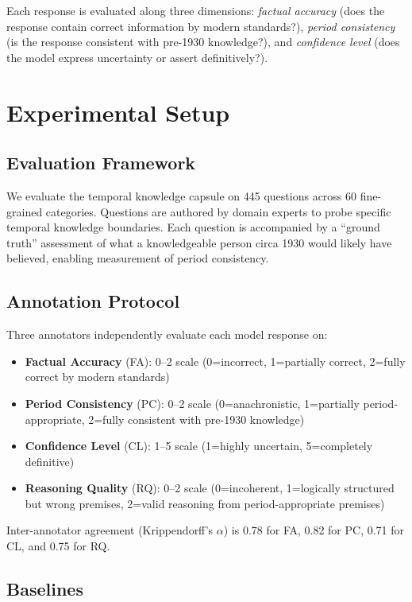 \documentclass[11pt]{article}
\begin{document}
Each response is evaluated along three dimensions: \textit{factual accuracy} (does the response contain correct information by modern standards?), \textit{period consistency} (is the response consistent with pre-1930 knowledge?), and \textit{confidence level} (does the model express uncertainty or assert definitively?).

\section{Experimental Setup}

\subsection{Evaluation Framework}

We evaluate the temporal knowledge capsule on 445 questions across 60 fine-grained categories. Questions are authored by domain experts to probe specific temporal knowledge boundaries. Each question is accompanied by a ``ground truth'' assessment of what a knowledgeable person circa 1930 would likely have believed, enabling measurement of period consistency.

\subsection{Annotation Protocol}

Three annotators independently evaluate each model response on:
\begin{itemize}[nosep,leftmargin=*]
\item \textbf{Factual Accuracy} (FA): 0--2 scale (0=incorrect, 1=partially correct, 2=fully correct by modern standards)
\item \textbf{Period Consistency} (PC): 0--2 scale (0=anachronistic, 1=partially period-appropriate, 2=fully consistent with pre-1930 knowledge)
\item \textbf{Confidence Level} (CL): 1--5 scale (1=highly uncertain, 5=completely definitive)
\item \textbf{Reasoning Quality} (RQ): 0--2 scale (0=incoherent, 1=logically structured but wrong premises, 2=valid reasoning from period-appropriate premises)
\end{itemize}

Inter-annotator agreement (Krippendorff's $\alpha$) is 0.78 for FA, 0.82 for PC, 0.71 for CL, and 0.75 for RQ.

\subsection{Baselines}
\end{document}
